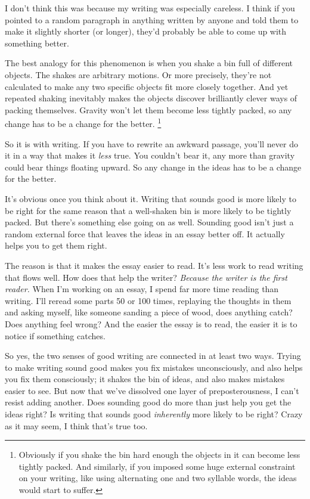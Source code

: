 I don't think this was because my writing was especially careless. I
think if you pointed to a random paragraph in anything written by anyone
and told them to make it slightly shorter (or longer), they'd probably
be able to come up with something better.

The best analogy for this phenomenon is when you shake a bin full of
different objects. The shakes are arbitrary motions. Or more precisely,
they're not calculated to make any two specific objects fit more closely
together. And yet repeated shaking inevitably makes the objects discover
brilliantly clever ways of packing themselves. Gravity won't let them
become less tightly packed, so any change has to be a change for the
better. \footnote{Obviously if you shake the bin hard enough the objects in it can
become less tightly packed. And similarly, if you imposed some huge
external constraint on your writing, like using alternating one and two
syllable words, the ideas would start to suffer.}

So it is with writing. If you have to rewrite an awkward passage, you'll
never do it in a way that makes it \emph{less} true. You couldn't bear
it, any more than gravity could bear things floating upward. So any
change in the ideas has to be a change for the better.

It's obvious once you think about it. Writing that sounds good is more
likely to be right for the same reason that a well-shaken bin is more
likely to be tightly packed. But there's something else going on as
well. Sounding good isn't just a random external force that leaves the
ideas in an essay better off. It actually helps you to get them right.

The reason is that it makes the essay easier to read. It's less work to
read writing that flows well. How does that help the writer?
\emph{Because the writer is the first reader.} When I'm working on an
essay, I spend far more time reading than writing. I'll reread some
parts 50 or 100 times, replaying the thoughts in them and asking myself,
like someone sanding a piece of wood, does anything catch? Does anything
feel wrong? And the easier the essay is to read, the easier it is to
notice if something catches.

So yes, the two senses of good writing are connected in at least two
ways. Trying to make writing sound good makes you fix mistakes
unconsciously, and also helps you fix them consciously; it shakes the
bin of ideas, and also makes mistakes easier to see. But now that we've
dissolved one layer of preposterousness, I can't resist adding another.
Does sounding good do more than just help you get the ideas right? Is
writing that sounds good \emph{inherently} more likely to be right?
Crazy as it may seem, I think that's true too.

